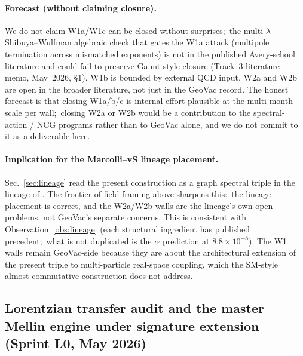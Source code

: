 \documentclass[11pt]{article}
\begin{document}
\paragraph{Forecast (without claiming closure).}

We do not claim W1a/W1c can be closed without surprises;\ the
multi-$\lambda$ Shibuya--Wulfman algebraic check that gates the W1a
attack (multipole termination across mismatched exponents)
is not in the published Avery-school literature and could fail to
preserve Gaunt-style closure (Track~3 literature memo, May~2026,
\S 1).  W1b is bounded by external QCD input.  W2a and W2b are open
in the broader literature, not just in the GeoVac record.  The honest
forecast is that closing W1a/b/c is internal-effort plausible at the
multi-month scale per wall;\ closing W2a or W2b would be a
contribution to the spectral-action / NCG programs rather than to
GeoVac alone, and we do not commit to it as a deliverable here.

\paragraph{Implication for the Marcolli--vS lineage placement.}

Sec.~\ref{sec:lineage} read the present construction as a graph
spectral triple in the lineage of \cite{marcolli_vs2014, perez_sanchez2024,
perez_sanchez2025}.  The frontier-of-field framing above sharpens this:\
the lineage placement is correct, and the W2a/W2b walls are the lineage's
own open problems, not GeoVac's separate concerns.  This is consistent
with Observation~\ref{obs:lineage} (each structural ingredient has
published precedent;\ what is not duplicated is the $\alpha$
prediction at $8.8 \times 10^{-8}$).  The W1 walls remain GeoVac-side
because they are about the architectural extension of the present
triple to multi-particle real-space coupling, which the SM-style almost-commutative
construction does not address.

\subsection{Lorentzian transfer audit and the master Mellin engine
under signature extension (Sprint L0, May 2026)}
\label{sec:lorentzian_audit_paper32}
\end{document}
